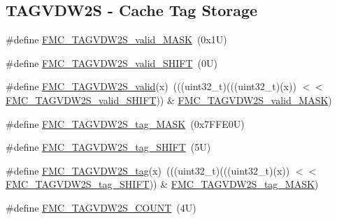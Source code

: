 \subsection*{T\+A\+G\+V\+D\+W2S -\/ Cache Tag Storage}
\begin{DoxyCompactItemize}
\item 
\#define \mbox{\hyperlink{group___f_m_c___register___masks_ga9a9bd5d3c2ddb39468a566b7b33a67af}{F\+M\+C\+\_\+\+T\+A\+G\+V\+D\+W2\+S\+\_\+valid\+\_\+\+M\+A\+SK}}~(0x1\+U)
\item 
\#define \mbox{\hyperlink{group___f_m_c___register___masks_ga7114b81f80486097779a48dbcf61574f}{F\+M\+C\+\_\+\+T\+A\+G\+V\+D\+W2\+S\+\_\+valid\+\_\+\+S\+H\+I\+FT}}~(0\+U)
\item 
\#define \mbox{\hyperlink{group___f_m_c___register___masks_ga10c968c585f5a0bd22dc870984114a44}{F\+M\+C\+\_\+\+T\+A\+G\+V\+D\+W2\+S\+\_\+valid}}(x)~(((uint32\+\_\+t)(((uint32\+\_\+t)(x)) $<$$<$ \mbox{\hyperlink{group___f_m_c___register___masks_ga7114b81f80486097779a48dbcf61574f}{F\+M\+C\+\_\+\+T\+A\+G\+V\+D\+W2\+S\+\_\+valid\+\_\+\+S\+H\+I\+FT}})) \& \mbox{\hyperlink{group___f_m_c___register___masks_ga9a9bd5d3c2ddb39468a566b7b33a67af}{F\+M\+C\+\_\+\+T\+A\+G\+V\+D\+W2\+S\+\_\+valid\+\_\+\+M\+A\+SK}})
\item 
\#define \mbox{\hyperlink{group___f_m_c___register___masks_gae2165ed5443bbd561078fa2ff8bf30e5}{F\+M\+C\+\_\+\+T\+A\+G\+V\+D\+W2\+S\+\_\+tag\+\_\+\+M\+A\+SK}}~(0x7\+F\+F\+E0\+U)
\item 
\#define \mbox{\hyperlink{group___f_m_c___register___masks_ga5e8d91c514d82c1ce5419cf5120ba178}{F\+M\+C\+\_\+\+T\+A\+G\+V\+D\+W2\+S\+\_\+tag\+\_\+\+S\+H\+I\+FT}}~(5\+U)
\item 
\#define \mbox{\hyperlink{group___f_m_c___register___masks_ga5bab632691e7c7f54e28b42b0898fbaf}{F\+M\+C\+\_\+\+T\+A\+G\+V\+D\+W2\+S\+\_\+tag}}(x)~(((uint32\+\_\+t)(((uint32\+\_\+t)(x)) $<$$<$ \mbox{\hyperlink{group___f_m_c___register___masks_ga5e8d91c514d82c1ce5419cf5120ba178}{F\+M\+C\+\_\+\+T\+A\+G\+V\+D\+W2\+S\+\_\+tag\+\_\+\+S\+H\+I\+FT}})) \& \mbox{\hyperlink{group___f_m_c___register___masks_gae2165ed5443bbd561078fa2ff8bf30e5}{F\+M\+C\+\_\+\+T\+A\+G\+V\+D\+W2\+S\+\_\+tag\+\_\+\+M\+A\+SK}})
\item 
\#define \mbox{\hyperlink{group___f_m_c___register___masks_ga9e1194ce2d0bb9bd8f071de2fbc112f4}{F\+M\+C\+\_\+\+T\+A\+G\+V\+D\+W2\+S\+\_\+\+C\+O\+U\+NT}}~(4\+U)
\end{DoxyCompactItemize}
